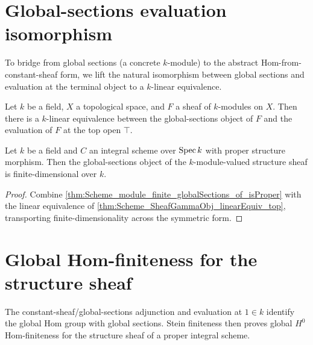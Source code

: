 \section{Global-sections evaluation isomorphism}
\label{sec:gammaObj_linearEquiv_top}

To bridge from global sections (a concrete \(k\)-module) to the abstract Hom-from-constant-sheaf form, we lift the natural isomorphism between global sections and evaluation at the terminal object to a \(k\)-linear equivalence.

\begin{theorem}\leanok
  \label{thm:Scheme_SheafGammaObj_linearEquiv_top}
  
  Let \(k\) be a field, \(X\) a topological space, and \(F\) a sheaf of \(k\)-modules on \(X\). Then there is a \(k\)-linear equivalence between the global-sections object of \(F\) and the evaluation of \(F\) at the top open \(\top\).
\end{theorem}

\begin{theorem}\leanok
  \label{thm:Scheme_module_finite_gammaObj_of_isProper}
  Let \(k\) be a field and \(C\) an integral scheme over \(\operatorname{Spec} k\) with proper structure morphism. Then the global-sections object of the \(k\)-module-valued structure sheaf is finite-dimensional over \(k\).
\end{theorem}

\begin{proof}
  
  \leanok
  Combine \cref{thm:Scheme_module_finite_globalSections_of_isProper} with the linear equivalence of \cref{thm:Scheme_SheafGammaObj_linearEquiv_top}, transporting finite-dimensionality across the symmetric form.
\end{proof}

\section{Global Hom-finiteness for the structure sheaf}
\label{sec:IsHModuleHomFinite_producer}

The constant-sheaf/global-sections adjunction and evaluation at \(1\in k\) identify the global Hom group with global sections. Stein finiteness then proves global \(H^0\) Hom-finiteness for the structure sheaf of a proper integral scheme.

